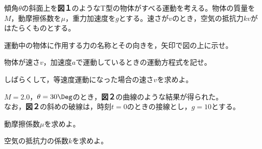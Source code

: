 \item
\begin{mawarikomi}{150pt}{}
    傾角$\theta $の斜面上を{\bf 図１}のようなT型の物体がすべる運動を考える。物体の質量を $M$，動摩擦係数を$\mu $，重力加速度を$g$とする。速さが$v$のとき，空気の抵抗力$kv$がはたらくものとする。
    \begin{Enumerate}
        \item 運動中の物体に作用する力の名称とその向きを，矢印で図の上に示せ。
        \item 物体が速さ$v$，加速度$a$で運動しているときの運動方程式を記せ。
        \item しばらくして，等速度運動になった場合の速さ$v$を求めよ。
    \end{Enumerate}
    $M=2.0$，$\theta =30\Deg$のとき，{\bf 図２}の曲線のような結果が得られた。\\ なお，{\bf 図２}の斜めの破線は，時刻$t=0$のときの接線とし，$g=10$とする。
    \begin{Enumerate*}
        \item 動摩擦係数$\mu $を求めよ。
        \item 空気の抵抗力の係数$k$を求めよ。
    \end{Enumerate*}
\end{mawarikomi}
